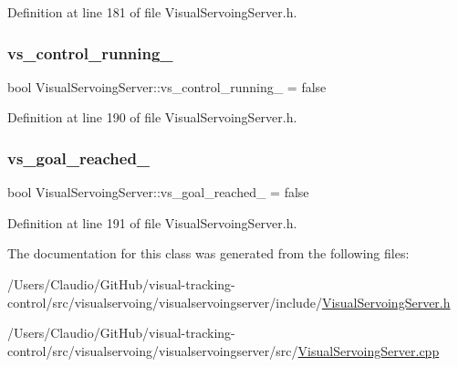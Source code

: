 Definition at line 181 of file Visual\+Servoing\+Server.\+h.

\mbox{\label{classVisualServoingServer_aeb48fa3b045d9fb074b03ea9d8441972}} 
\subsubsection{\texorpdfstring{vs\+\_\+control\+\_\+running\+\_\+}{vs\_control\_running\_}}
{\footnotesize\ttfamily bool Visual\+Servoing\+Server\+::vs\+\_\+control\+\_\+running\+\_\+ = false\hspace{0.3cm}{\ttfamily [private]}}



Definition at line 190 of file Visual\+Servoing\+Server.\+h.

\mbox{\label{classVisualServoingServer_aae9c2aa802fa83d8b77b5094af94fa38}} 
\subsubsection{\texorpdfstring{vs\+\_\+goal\+\_\+reached\+\_\+}{vs\_goal\_reached\_}}
{\footnotesize\ttfamily bool Visual\+Servoing\+Server\+::vs\+\_\+goal\+\_\+reached\+\_\+ = false\hspace{0.3cm}{\ttfamily [private]}}



Definition at line 191 of file Visual\+Servoing\+Server.\+h.



The documentation for this class was generated from the following files\+:\begin{DoxyCompactItemize}
\item 
/\+Users/\+Claudio/\+Git\+Hub/visual-\/tracking-\/control/src/visualservoing/visualservoingserver/include/\hyperlink{VisualServoingServer_8h}{Visual\+Servoing\+Server.\+h}\item 
/\+Users/\+Claudio/\+Git\+Hub/visual-\/tracking-\/control/src/visualservoing/visualservoingserver/src/\hyperlink{VisualServoingServer_8cpp}{Visual\+Servoing\+Server.\+cpp}\end{DoxyCompactItemize}
